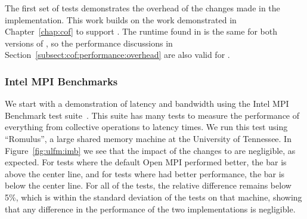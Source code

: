 The first set of tests demonstrates the overhead of the changes made in the \mpi 
implementation. This work builds on the work demonstrated in 
Chapter~\ref{chap:cof} to support \cof. The runtime found in \cof is the same for 
both versions of \mpi, so the performance discussions in 
Section~\ref{subsect:cof:performance:overhead} are also valid for \ulfm.

\subsubsection{Intel MPI Benchmarks}

We start with a demonstration of latency and bandwidth using the Intel MPI 
Benchmark test suite~\cite{IMB}. This suite has many tests to measure the 
performance of everything from collective operations to latency times. We run this 
test using ``Romulus'', a large shared memory machine at the University of 
Tennessee. In Figure~\ref{fig:ulfm:imb} we see that the impact of the \ulfm 
changes to \mpi are negligible, as expected. For tests where the default Open MPI 
performed better, the bar is above the center line, and for tests where \ulfm had 
better performance, the bar is below the center line. For all of the tests, the 
relative difference remains below 5\%, which is within the standard deviation of 
the tests on that machine, showing that any difference in the performance of the 
two implementations is negligible.

